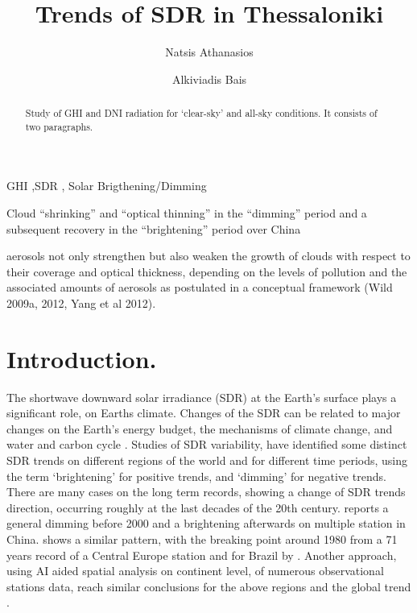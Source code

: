\documentclass[preprint, 3p,
authoryear]{elsarticle} %
\begin{document}
\begin{frontmatter}

  \title{Trends of SDR in Thessaloniki}
    \author[Laboratory of Atmospheric Physics]{Natsis Athanasios%
  }
    \author[Laboratory of Atmospheric Physics]{Alkiviadis Bais%
  }
  
  \begin{abstract}
  Study of GHI and DNI radiation for `clear-sky' and all-sky conditions.
  It consists of two paragraphs.
  \end{abstract}
    \begin{keyword}
    GHI \sep SDR \sep 
    Solar Brigthening/Dimming
  \end{keyword}
  
 \end{frontmatter}

Cloud ``shrinking'' and ``optical thinning'' in the ``dimming'' period
and a subsequent recovery in the ``brightening'' period over China

aerosols not only strengthen but also weaken the growth of clouds with
respect to their coverage and optical thickness, depending on the levels
of pollution and the associated amounts of aerosols as postulated in a
conceptual framework (Wild 2009a, 2012, Yang et al 2012).

\hypertarget{introduction.}{%
\section{Introduction.}\label{introduction.}}

The shortwave downward solar irradiance (SDR) at the Earth's surface
plays a significant role, on Earths climate. Changes of the SDR can be
related to major changes on the Earth's energy budget, the mechanisms of
climate change, and water and carbon cycle \citep{Wild2009}. Studies of
SDR variability, have identified some distinct SDR trends on different
regions of the world and for different time periods, using the term
`brightening' for positive trends, and `dimming' for negative trends.
There are many cases on the long term records, showing a change of SDR
trends direction, occurring roughly at the last decades of the 20th
century. \citet{Yang2021} reports a general dimming before 2000 and a
brightening afterwards on multiple station in China. \citet{Wild2021}
shows a similar pattern, with the breaking point around 1980 from a 71
years record of a Central Europe station and for Brazil by
\citet{Yamasoe2021}. Another approach, using AI aided spatial analysis
on continent level, of numerous observational stations data, reach
similar conclusions for the above regions and the global trend
\citep{Yuan2021}.
\end{document}
